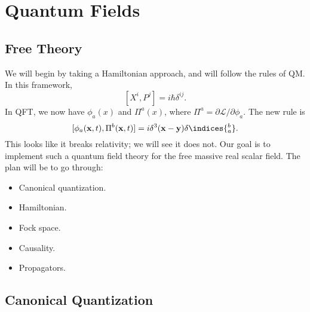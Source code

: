 \documentclass[12pt]{article}
\begin{document}
\section{Quantum Fields}%
\label{sec:qf}

\subsection{Free Theory}%
\label{sub:qfft}

We will begin by taking a Hamiltonian approach, and will follow the rules of QM. In this framework,
\[
	[X^i, P^j] = i \hbar \delta^{ij}.
\]
In QFT, we now have $\phi_a(x)$ and $\Pi^a(x)$, where $\Pi^a = \partial \mathcal{L} / \partial \phi_a$. The new rule is
\[
	[\phi_a(\mathbf{x}, t), \Pi^b(\mathbf{x}, t)] = i \delta^3(\mathbf{x} - \mathbf{y}) \delta\indices{^{b}_{a}}.
\]
This looks like it breaks relativity; we will see it does not. Our goal is to implement such a quantum field theory for the free massive real scalar field. The plan will be to go through:
\begin{itemize}
	\item Canonical quantization.
	\item Hamiltonian.
	\item Fock space.
	\item Causality.
	\item Propagators.
\end{itemize}

\subsection{Canonical Quantization}%
\label{sub:cq}
\end{document}
